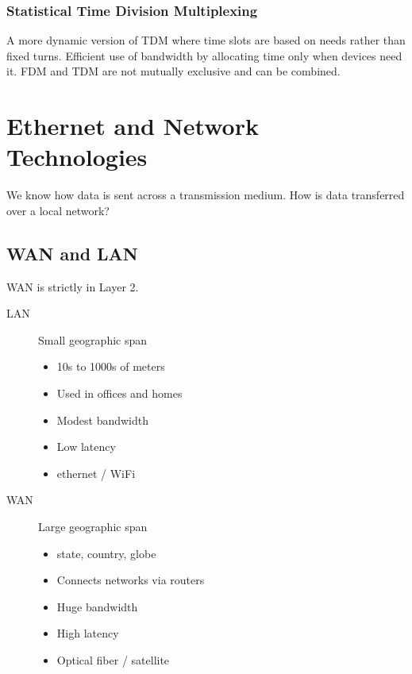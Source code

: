 \documentclass{article}
\begin{document}
\subsubsection*{Statistical Time Division Multiplexing}
A more dynamic version of TDM where time slots are based on needs rather than
fixed turns.
Efficient use of bandwidth by allocating time only when devices need it.
FDM and TDM are not mutually exclusive and can be combined.

\newpage
\section*{Ethernet and Network Technologies}
We know how data is sent across a transmission medium.
How is data transferred over a local network?

\subsection*{WAN and LAN}
WAN is strictly in Layer 2.
\begin{multicols}{2}
    \begin{description}
        \item[LAN] Small geographic span
              \begin{itemize}
                  \item 10s to 1000s of meters
                  \item Used in offices and homes
                  \item Modest bandwidth
                  \item Low latency
                  \item ethernet / WiFi
              \end{itemize}
    \end{description}
    \begin{description}
        \item[WAN] Large geographic span
              \begin{itemize}
                  \item state, country, globe
                  \item Connects networks via routers
                  \item Huge bandwidth
                  \item High latency
                  \item Optical fiber / satellite
              \end{itemize}
    \end{description}
\end{multicols}
\end{document}
